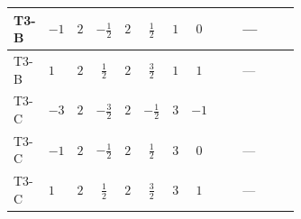 \documentclass[8pt]{article}
\begin{document}
\begin{landscape}
\begin{longtable}{@{}llcccccc >{\raggedright\arraybackslash}p{0.21\linewidth} >{\raggedright\arraybackslash}p{0.21\linewidth} >{\raggedright\arraybackslash}p{0.21\linewidth}@{}}
\midrule
T3-B & $-1$ & $2$ & $-\frac{1}{2}$ & $2$ & $\frac{1}{2}$ & $1$ & $0$ & \scriptsize\adjustbox{max width=\linewidth}{$\begin{gathered} +16 {\lambda_5} \left({\lambda_5}\right)^{*}\end{gathered}$} & --- & \scriptsize\adjustbox{max width=\linewidth}{$\begin{gathered} -9 {g_2}^2 {\lambda_{HS_2}^{(A)}}\end{gathered}$} \\
\midrule
T3-B & $1$ & $2$ & $\frac{1}{2}$ & $2$ & $\frac{3}{2}$ & $1$ & $1$ & \scriptsize\adjustbox{max width=\linewidth}{$\begin{gathered} +16 {\lambda_5} \left({\lambda_5}\right)^{*}\end{gathered}$} & --- & \scriptsize\adjustbox{max width=\linewidth}{$\begin{gathered} -9 {g_2}^2 {\lambda_{HS_2}^{(A)}}\end{gathered}$} \\
\midrule
T3-C & $-3$ & $2$ & $-\frac{3}{2}$ & $2$ & $-\frac{1}{2}$ & $3$ & $-1$ & \scriptsize\adjustbox{max width=\linewidth}{$\begin{gathered} +16 {\lambda_5} \left({\lambda_5}\right)^{*}\end{gathered}$} & \scriptsize\adjustbox{max width=\linewidth}{$\begin{gathered} +{g_1}^2 \left(-6 {g_2}^2-3 {\lambda_{HS_2}^{(A)}}\right)\end{gathered}$} & \scriptsize\adjustbox{max width=\linewidth}{$\begin{gathered} -9 {g_2}^2 {\lambda_{HS_2}^{(A)}}\end{gathered}$} \\
\midrule
T3-C & $-1$ & $2$ & $-\frac{1}{2}$ & $2$ & $\frac{1}{2}$ & $3$ & $0$ & \scriptsize\adjustbox{max width=\linewidth}{$\begin{gathered} +16 {\lambda_5} \left({\lambda_5}\right)^{*}\end{gathered}$} & --- & \scriptsize\adjustbox{max width=\linewidth}{$\begin{gathered} -9 {g_2}^2 {\lambda_{HS_2}^{(A)}}\end{gathered}$} \\
\midrule
T3-C & $1$ & $2$ & $\frac{1}{2}$ & $2$ & $\frac{3}{2}$ & $3$ & $1$ & \scriptsize\adjustbox{max width=\linewidth}{$\begin{gathered} +16 {\lambda_5} \left({\lambda_5}\right)^{*}\end{gathered}$} & --- & \scriptsize\adjustbox{max width=\linewidth}{$\begin{gathered} -9 {g_2}^2 {\lambda_{HS_2}^{(A)}}\end{gathered}$} \\

\end{longtable}
\end{landscape}
\end{document}
